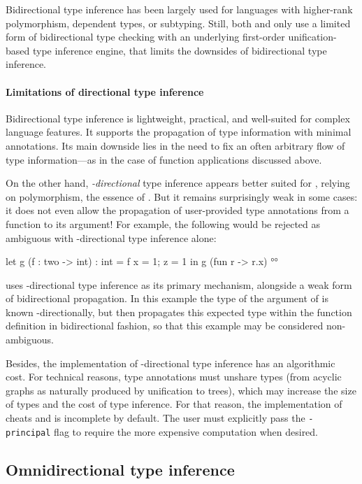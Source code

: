 \documentclass[acmsmall,screen,nonacm,review]{acmart}
\begin{document}
Bidirectional type inference has been largely used for languages with
higher-rank polymorphism, dependent types, or subtyping.  Still, both \OCaml
and \Haskell only use a limited form of bidirectional type checking with an
underlying first-order unification-based type inference engine, that limits
the downsides of bidirectional type inference.


\paragraph{Limitations of directional type inference}

Bidirectional type inference is lightweight, practical, and well-suited for
complex language features. It supports the propagation of type information with
minimal annotations. Its main downside lies in the need to fix an often
arbitrary flow of type information---as in the case of function applications
discussed above.

On the other hand, \emph{\Geninst-directional} type inference appears better
suited for \ML, relying on polymorphism, the essence of \ML. But it remains
surprisingly weak in some cases: it does not even allow the propagation of
user-provided type annotations from a function to its argument! For example,
the following would be rejected as ambiguous with \geninst-directional type
inference alone:
\begin{program}[input]
let g (f : two -> int) : int = f {x = 1; z = 1} in g (fun r -> r.x)$
$ °°
\end{program}

\OCaml uses \geninst-directional type inference as its primary mechanism, alongside
a weak form of bidirectional propagation. In this example the type
of the argument of  is known \Geninst-directionally, but \OCaml then
propagates this expected type within the function definition in bidirectional
fashion, so that this example may be considered non-ambiguous.

Besides, the implementation of \geninst-directional type inference has an
algorithmic cost. For technical reasons, type annotations must unshare
types (from acyclic graphs as naturally produced by unification to trees),
which may increase the size of types and the cost of type inference. For
that reason, the implementation of \OCaml cheats and is incomplete by
default. The user must explicitly pass the \texttt{\small -principal} flag to
require the more expensive computation when desired.

\subsection{Omnidirectional type inference}
\end{document}
